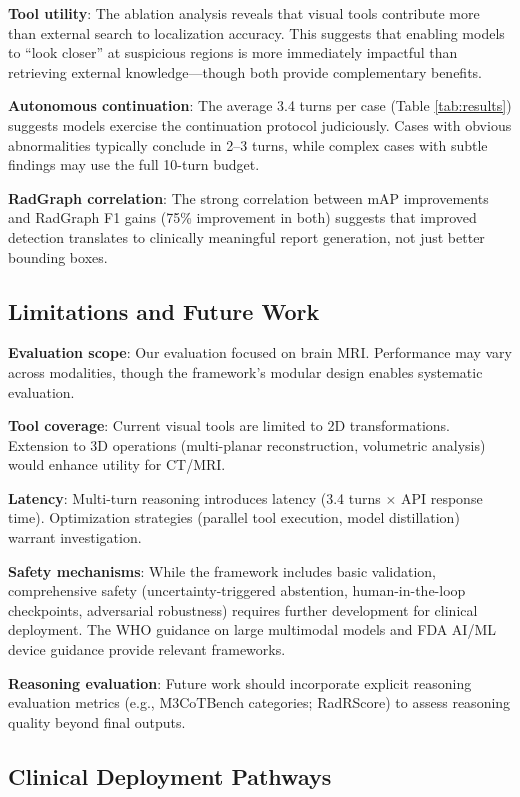 \documentclass[11pt]{article}
\begin{document}
\textbf{Tool utility}: The ablation analysis reveals that visual tools contribute more than external search to localization accuracy. This suggests that enabling models to ``look closer'' at suspicious regions is more immediately impactful than retrieving external knowledge---though both provide complementary benefits.

\textbf{Autonomous continuation}: The average 3.4 turns per case (Table \ref{tab:results}) suggests models exercise the continuation protocol judiciously. Cases with obvious abnormalities typically conclude in 2--3 turns, while complex cases with subtle findings may use the full 10-turn budget.

\textbf{RadGraph correlation}: The strong correlation between mAP improvements and RadGraph F1 gains (75\% improvement in both) suggests that improved detection translates to clinically meaningful report generation, not just better bounding boxes.

\subsection{Limitations and Future Work}

\textbf{Evaluation scope}: Our evaluation focused on brain MRI. Performance may vary across modalities, though the framework's modular design enables systematic evaluation.

\textbf{Tool coverage}: Current visual tools are limited to 2D transformations. Extension to 3D operations (multi-planar reconstruction, volumetric analysis) would enhance utility for CT/MRI.

\textbf{Latency}: Multi-turn reasoning introduces latency (3.4 turns $\times$ API response time). Optimization strategies (parallel tool execution, model distillation) warrant investigation.

\textbf{Safety mechanisms}: While the framework includes basic validation, comprehensive safety (uncertainty-triggered abstention, human-in-the-loop checkpoints, adversarial robustness) requires further development for clinical deployment. The WHO guidance on large multimodal models \citep{who2024guidance} and FDA AI/ML device guidance \citep{fdaguidance} provide relevant frameworks.

\textbf{Reasoning evaluation}: Future work should incorporate explicit reasoning evaluation metrics (e.g., M3CoTBench categories; RadRScore) to assess reasoning quality beyond final outputs.

\subsection{Clinical Deployment Pathways}
\end{document}
